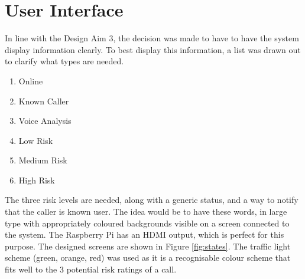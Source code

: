 \documentclass[main.tex]{subfiles}
\begin{document}
\section{User Interface}
In line with the Design Aim 3, the decision was made to have to have the system display information clearly. To best display this information, a list was drawn out to clarify what types are needed.

\begin{enumerate}
	\item Online
	\item Known Caller
	\item Voice Analysis
	\item Low Risk
	\item Medium Risk
	\item High Risk
\end{enumerate}

The three risk levels are needed, along with a generic status, and a way to notify that the caller is known user. The idea would be to have these words, in large type with appropriately coloured backgrounds visible on a screen connected to the system. The Raspberry Pi has an HDMI output, which is perfect for this purpose. The designed screens are shown in Figure \ref{fig:states}. The traffic light scheme (green, orange, red) was used as it is a recognisable colour scheme that fits well to the 3 potential risk ratings of a call.
\end{document}
